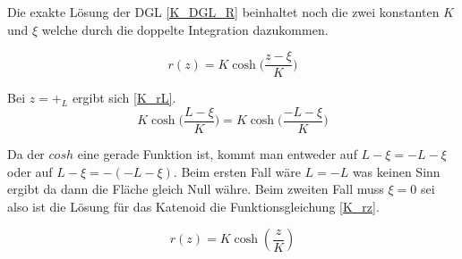 \begin{refsection}
Die exakte Lösung der DGL \eqref{K_DGL_R} beinhaltet noch die zwei konstanten $K$ und $\xi$ welche durch die doppelte Integration dazukommen.

\begin{equation} \label{K_r}
r(z)=K \cosh\bigg(\frac{z-\xi}{K}\bigg)
\end{equation}

Bei $z=+_L$ ergibt sich \eqref{K_rL}.
\begin{equation} \label{K_rL}
K \cosh\bigg(\frac{L-\xi}{K}\bigg)=K \cosh\bigg(\frac{-L-\xi}{K}\bigg)
\end{equation}

Da der $cosh$ eine gerade Funktion ist, kommt man entweder auf $L-\xi=-L-\xi$ oder auf $L-\xi=-(-L-\xi)$.
Beim ersten Fall wäre $L=-L$ was keinen Sinn ergibt da dann die Fläche gleich Null währe. Beim zweiten Fall muss $\xi=0$ sei also ist die Lösung für das Katenoid die Funktionsgleichung \eqref{K_rz}.

\begin{equation} \label{K_rz}
r(z)=K \cosh\left(\frac{z}{K}\right)
\end{equation}





\end{refsection}
